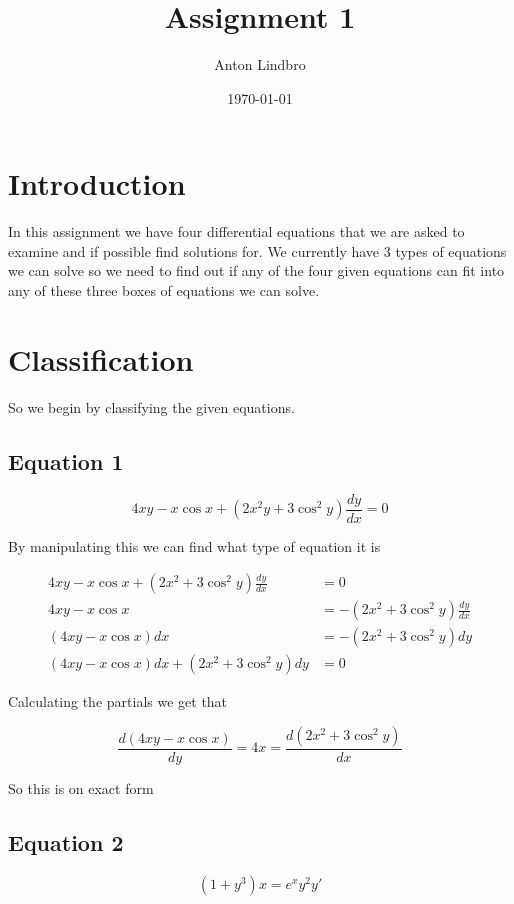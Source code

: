 \documentclass[a4paper]{article}
\title{Assignment 1}
\author{Anton Lindbro}
\date{\today}
\begin{document}
\maketitle

\section{Introduction}
In this assignment we have four differential equations that we are asked to examine and if possible find solutions for. We currently have 3 types of equations we can solve so we need to find out if any of the four given equations can fit into any of these three boxes of equations we can solve.

\section{Classification}
So we begin by classifying the given equations.

\subsection{Equation 1}
\begin{equation}
    4xy - x\cos{x} + (2x^2y + 3\cos^2{y})\frac{dy}{dx} = 0
\end{equation}

By manipulating this we can find what type of equation it is

\begin{align}
    4xy - x\cos{x} + (2x^2 + 3\cos^2{y})\frac{dy}{dx} &= 0\\
    4xy - x\cos{x} &= -(2x^2 + 3\cos^2{y})\frac{dy}{dx}\\
    (4xy - x\cos{x})dx &= -(2x^2 + 3\cos^2{y})dy\\
    (4xy - x\cos{x})dx + (2x^2 + 3\cos^2{y})dy &= 0
\end{align}

Calculating the partials we get that 

\begin{equation}
    \frac{d(4xy - x\cos{x})}{dy} = 4x = \frac{d(2x^2 + 3\cos^2{y})}{dx}
\end{equation}

So this is on exact form

\subsection{Equation 2}

\begin{equation}
    (1+y^3)x = e^x y^2 y'
\end{equation}
\end{document}
